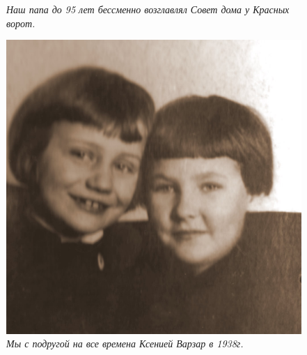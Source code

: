 \documentclass[utf8x, 12pt]{G7-32a} %
\begin{document}
\begin{figure}[h!]
\begin{minipage}[h]{85mm}
       \itshape{Наш папа до 95 лет бессменно возглавлял Совет дома у Красных ворот.}
   \end{minipage}
   \hfill
    \begin{minipage}[h!]{59mm}
        \includegraphics[width=\linewidth]{inc/Menshekovy/23.jpg}
        \itshape{Мы с подругой на все времена Ксенией Варзар в 1938г.}
    \end{minipage}
\end{figure}
\vspace{20pt}
\end{document}
